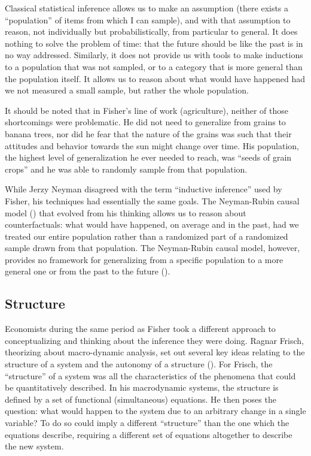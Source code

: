 \documentclass[a4paper,12pt]{article}
\begin{document}
Classical statistical inference allows us to make an assumption (there exists a ``population'' of items from which I can sample), and with that assumption to reason, not individually but probabilistically, from particular to general. It does nothing to solve the problem of time: that the future should be like the past is in no way addressed. Similarly, it does not provide us with tools to make inductions to a population that was not sampled, or to a category that is more general than the population itself. It allows us to reason about what would have happened had we not measured a small sample, but rather the whole population.

It should be noted that in Fisher's line of work (agriculture), neither of those shortcomings were problematic. He did not need to generalize from grains to banana trees, nor did he fear that the nature of the grains was such that their attitudes and behavior towards the sun might change over time. His population, the highest level of generalization he ever needed to reach, was ``seeds of grain crops'' and he was able to randomly sample from that population. 

While Jerzy Neyman disagreed with the term ``inductive inference'' used by Fisher, his techniques had essentially the same goals. The Neyman-Rubin causal model (\cite{Holland1986}) that evolved from his thinking allows us to reason about counterfactuals: what would have happened, on average and in the past, had we treated our entire population rather than a randomized part of a randomized sample drawn from that population. The Neyman-Rubin causal model, however, provides no framework for generalizing from a specific population to a more general one or from the past to the future (\cite{Heckman2008}).

\subsection*{Structure}

Economists during the same period as Fisher took a different approach to conceptualizing and thinking about the inference they were doing. Ragnar Frisch, theorizing about macro-dynamic analysis, set out several key ideas relating to the structure of a system and the autonomy of a structure (\cite{Frisch1995}). For Frisch, the ``structure'' of a system was all the characteristics of the phenomena that could be quantitatively described. In his macrodynamic systems, the structure is defined by a set of functional (simultaneous) equations. He then poses the question: what would happen to the system due to an arbitrary change in a single variable? To do so could imply a different ``structure'' than the one which the equations describe, requiring a different set of equations altogether to describe the new system.
\end{document}
